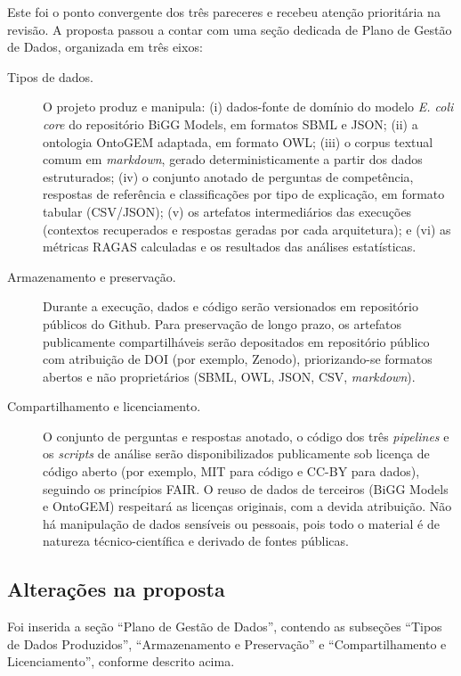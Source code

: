 \documentclass{article}
\begin{document}
	Este foi o ponto convergente dos três pareceres e recebeu atenção prioritária
	na revisão. A proposta passou a contar com uma seção dedicada de Plano de Gestão
	de Dados, organizada em três eixos:
	
	\begin{description}
		\item[Tipos de dados.] O projeto produz e manipula: (i) dados-fonte de domínio
		do modelo \textit{E. coli core} do repositório BiGG Models, em formatos SBML e
		JSON; (ii) a ontologia OntoGEM adaptada, em formato OWL; (iii) o corpus textual
		comum em \textit{markdown}, gerado deterministicamente a partir dos dados
		estruturados; (iv) o conjunto anotado de perguntas de competência, respostas de
		referência e classificações por tipo de explicação, em formato tabular
		(CSV/JSON); (v) os artefatos intermediários das execuções (contextos recuperados
		e respostas geradas por cada arquitetura); e (vi) as métricas RAGAS calculadas e
		os resultados das análises estatísticas.
		
		\item[Armazenamento e preservação.] Durante a execução, dados e código serão
		versionados em repositório públicos do Github. Para preservação de longo
		prazo, os artefatos publicamente compartilháveis serão depositados em repositório
		público com atribuição de DOI (por exemplo, Zenodo), priorizando-se formatos
		abertos e não proprietários (SBML, OWL, JSON, CSV, \textit{markdown}).
		
		\item[Compartilhamento e licenciamento.] O conjunto de perguntas e respostas
		anotado, o código dos três \textit{pipelines} e os \textit{scripts} de análise
		serão disponibilizados publicamente sob licença de código aberto (por exemplo,
		MIT para código e CC-BY para dados), seguindo os princípios FAIR. O reuso de
		dados de terceiros (BiGG Models e OntoGEM) respeitará as licenças originais, com
		a devida atribuição. Não há manipulação de dados sensíveis ou pessoais, pois todo
		o material é de natureza técnico-científica e derivado de fontes públicas.
	\end{description}
	
	\subsection{Alterações na proposta}
	
	Foi inserida a seção ``Plano de Gestão de Dados'', contendo as subseções
	``Tipos de Dados Produzidos'', ``Armazenamento e Preservação'' e
	``Compartilhamento e Licenciamento'', conforme descrito acima.
	
\end{document}
